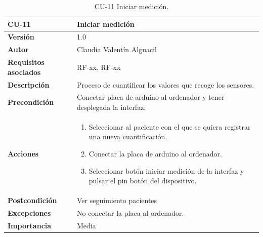\begin{table}[p]
	\centering
	\begin{tabularx}{\linewidth}{ p{} p{} }
		\toprule
		\textbf{CU-11}    & \textbf{Iniciar medición}\\
		\toprule
		\textbf{Versión}              & 1.0    \\
		\textbf{Autor}                & Claudia Valentín Alguacil \\
		\textbf{Requisitos asociados} & RF-xx, RF-xx \\
		\textbf{Descripción}          & Proceso de cuantificar los valores que recoge los sensores. \\
		\textbf{Precondición}         & Conectar placa de arduino al ordenador y tener desplegada la interfaz. \\
		\textbf{Acciones}             &
		\begin{enumerate}
			\def\labelenumi{\arabic{enumi}.}
			\tightlist
			\item Seleccionar al paciente con el que se quiera registrar una nueva cuantificación.
			\item Conectar la placa de arduino al ordenador.
                \item Seleccionar botón iniciar medición de la interfaz y pulsar el pin botón del dispositivo.
		\end{enumerate}\\
		\textbf{Postcondición}        &  Ver seguimiento pacientes\\
		\textbf{Excepciones}          & No conectar la placa al ordenador. \\
		\textbf{Importancia}          & Media \\
		\bottomrule
	\end{tabularx}
	\caption{CU-11 Iniciar medición.}
\end{table}

